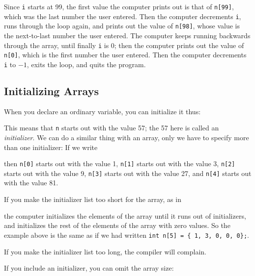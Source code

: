Since {\tt i} starts at 99, the first value the computer prints out is
that of {\tt n[99]}, which was the last number the user entered.  Then
the computer decrements {\tt i}, runs through the loop again, and prints
out the value of {\tt n[98]}, whose value is the next-to-last number the
user entered.  The computer keeps running backwards through the array,
until finally {\tt i} is 0; then the computer prints out the value of
{\tt n[0]}, which is the first number the user entered.  Then the
computer decrements {\tt i} to $-1$, exits the loop, and quits the
program.

\subsection{Initializing Arrays}

When you declare an ordinary variable, you can initialize it thus:

\begin{flushleft}
\verb% int n = 57; %
\end{flushleft}

This means that {\tt n} starts out with the value 57; the 57 here is
called an {\em initializer}.  We can do a similar thing with an array,
only we have to specify more than one initializer: If we write

\begin{flushleft}
\verb% int n[5] = { 1, 3, 9, 27, 81} ; %
\end{flushleft}

\noindent then
{\tt n[0]} starts out with the value 1,
{\tt n[1]} starts out with the value 3,
{\tt n[2]} starts out with the value 9,
{\tt n[3]} starts out with the value 27, and
{\tt n[4]} starts out with the value 81.  

If you make the initializer list too short for the array, as in

\begin{flushleft}
\verb% int n[5] = { 1, 3 }; %
\end{flushleft}

\noindent the computer initializes the elements of the array until it
runs out of initializers, and initializes the rest of the elements of
the array with zero values.  So the example above is the same as if we
had written {\tt int n[5] = \{ 1, 3, 0, 0, 0\};}.

If you make the initializer list too long, the compiler will complain.

If you include an initializer, you can omit the array size:

